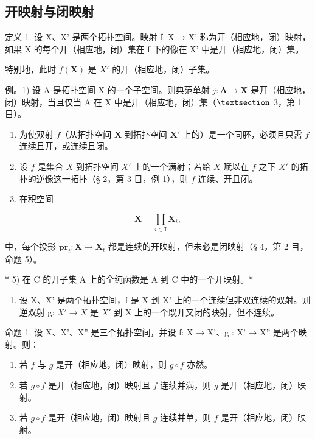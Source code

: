 \subsection{开映射与闭映射}

定义 1. 设 X、X' 是两个拓扑空间。映射 f: X → X' 称为开（相应地，闭）映射，如果 X 的每个开（相应地，闭）集在 f 下的像在 X' 中是开（相应地，闭）集。

特别地，此时 \(f(\mathbf{X})\) 是 \(X'\) 的开（相应地，闭）子集。

例。1) 设 A 是拓扑空间 X 的一个子空间。则典范单射 \(j: \mathbf{A} \to \mathbf{X}\) 是开（相应地，闭）映射，当且仅当 A 在 X 中是开（相应地，闭）集（\(\S\) 3，第 1 目）。

\begin{enumerate}
\def\labelenumi{\arabic{enumi})}
\setcounter{enumi}{1}
\item
  为使双射 \(f\)（从拓扑空间 \(\mathbf{X}\) 到拓扑空间 \(\mathbf{X}'\) 上的）是一个同胚，必须且只需 \(f\) 连续且开，或连续且闭。
\item
  设 \(f\) 是集合 \(X\) 到拓扑空间 \(X'\) 上的一个满射；若给 \(X\) 赋以在 \(f\) 之下 \(X'\) 的拓扑的逆像这一拓扑（§ 2，第 3 目，例 1），则 \(f\) 连续、开且闭。
\item
  在积空间
\end{enumerate}

\[
\mathbf {X} = \prod_ {i \in \mathbf {I}} \mathbf {X} _ {i},
\]

中，每个投影 \(\mathbf{pr}_{t}:\mathbf{X}\to\mathbf{X}_{t}\) 都是连续的开映射，但未必是闭映射（§ 4，第 2 目，命题 5）。

* 5) 在 C 的开子集 A 上的全纯函数是 A 到 C 中的一个开映射。*

\begin{enumerate}
\def\labelenumi{\arabic{enumi})}
\setcounter{enumi}{5}
\tightlist
\item
  设 X、X' 是两个拓扑空间，f 是 X 到 X' 上的一个连续但非双连续的双射。则逆双射 g: \(X' \rightarrow X\) 是 \(X'\) 到 X 上的一个既开又闭的映射，但不连续。
\end{enumerate}

命题 1. 设 X、X'、X'' 是三个拓扑空间，并设 f: X → X'、g : X' → X'' 是两个映射。则：

\begin{enumerate}
\def\labelenumi{\alph{enumi})}
\item
  若 \(f\) 与 \(g\) 是开（相应地，闭）映射，则 \(g \circ f\) 亦然。
\item
  若 \(g \circ f\) 是开（相应地，闭）映射且 \(f\) 连续并满，则 \(g\) 是开（相应地，闭）映射。
\item
  若 \(g \circ f\) 是开（相应地，闭）映射且 \(g\) 连续并单，则 \(f\) 是开（相应地，闭）映射。
\end{enumerate}

